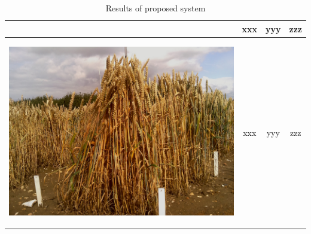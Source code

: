\begin{table}[hp!]
\begin{tabular}{ | c | c | c | c |}
\begin{minipage}{.3\textwidth}
\begin{center}
      \end{center}
    \end{minipage}
    &
      xxx
    & 
      yyy
    & 
      zzz
    \\ \hline
    \begin{minipage}{.3\textwidth}
      \begin{center}
		\includegraphics[width=\linewidth]{Images/006}
      \end{center}
    \end{minipage}
    &
      xxx
    & 
      yyy
    & 
      zzz
    \\ \hline
  \end{tabular}
  \caption{Results of proposed system}\label{tbl:myLboro}
\end{table}


